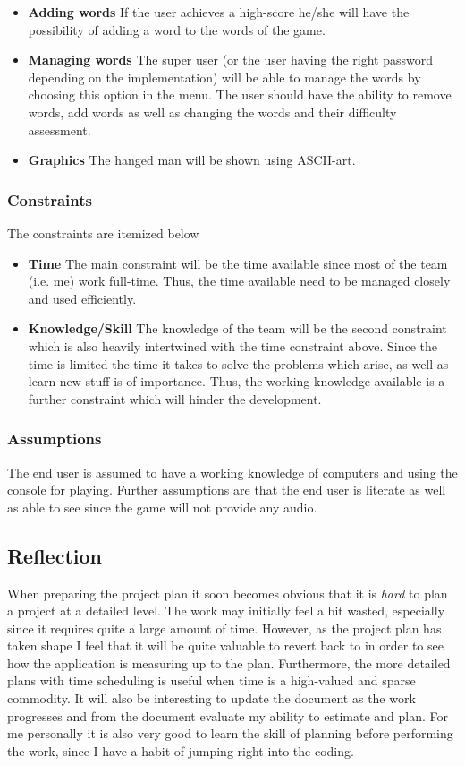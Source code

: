 \documentclass[12pt, letterpaper]{article}
\begin{document}
\begin{itemize}
	\item \textbf{Adding words} If the user achieves a high-score he/she will have the possibility of adding a word to the words of the game.
	\item \textbf{Managing words} The super user (or the user having the right password depending on the implementation) will be able to manage the words by choosing this option in the menu. The user should have the ability to remove words, add words as well as changing the words and their difficulty assessment.
	\item \textbf{Graphics} The hanged man will be shown using ASCII-art.
\end{itemize}
\subsubsection{Constraints}
The constraints are itemized below
\begin{itemize}
	\item \textbf{Time}	The main constraint will be the time available since most of the team (i.e. me) work full-time. Thus, the time available need to be managed closely and used efficiently. 
	\item \textbf{Knowledge/Skill} The knowledge of the team will be the second constraint which is also heavily intertwined with the time constraint above. Since the time is limited the time it takes to solve the problems which arise, as well as learn new stuff is of importance. Thus, the working knowledge available is a further constraint which will hinder the development. 
\end{itemize}

\subsubsection{Assumptions}
The end user is assumed to have a working knowledge of computers and using the console for playing. Further assumptions are that the end user is literate as well as able to see since the game will not provide any audio.

\subsection{Reflection}
When preparing the project plan it soon becomes obvious that it is \emph{hard} to plan a project at a detailed level. The work may initially feel a bit wasted, especially since it requires quite a large amount of time. However, as the project plan has taken shape I feel that it will be quite valuable to revert back to in order to see how the application is measuring up to the plan. Furthermore, the more detailed plans with time scheduling is useful when time is a high-valued and sparse commodity. It will also be interesting to update the document as the work progresses and from the document evaluate my ability to estimate and plan. For me personally it is also very good to learn the skill of planning before performing the work, since I have a habit of jumping right into the coding.
\newpage
\end{document}
